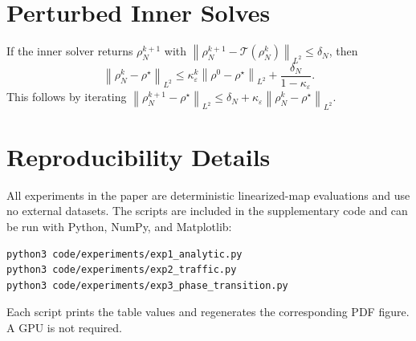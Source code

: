 \documentclass{article}
\newcommand{\eps}{\varepsilon}
\newcommand{\norm}[1]{\left\lVert #1 \right\rVert}
\begin{document}
\section{Perturbed Inner Solves}

If the inner solver returns \(\rho_N^{k+1}\) with
\(\norm{\rho_N^{k+1}-\mathcal{T}(\rho_N^k)}_{L^2}\leq\delta_N\), then
\[
  \norm{\rho_N^k-\rho^\star}_{L^2}
  \leq
  \kappa_\eps^k\norm{\rho^0-\rho^\star}_{L^2}
  +\frac{\delta_N}{1-\kappa_\eps}.
\]
This follows by iterating
\(\norm{\rho_N^{k+1}-\rho^\star}_{L^2}\leq
\delta_N+\kappa_\eps\norm{\rho_N^k-\rho^\star}_{L^2}\).

\section{Reproducibility Details}

All experiments in the paper are deterministic linearized-map evaluations and
use no external datasets.  The scripts are included in the supplementary code
and can be run with Python, NumPy, and Matplotlib:
\begin{verbatim}
python3 code/experiments/exp1_analytic.py
python3 code/experiments/exp2_traffic.py
python3 code/experiments/exp3_phase_transition.py
\end{verbatim}
Each script prints the table values and regenerates the corresponding PDF
figure.  A GPU is not required.

\newpage

\end{document}
